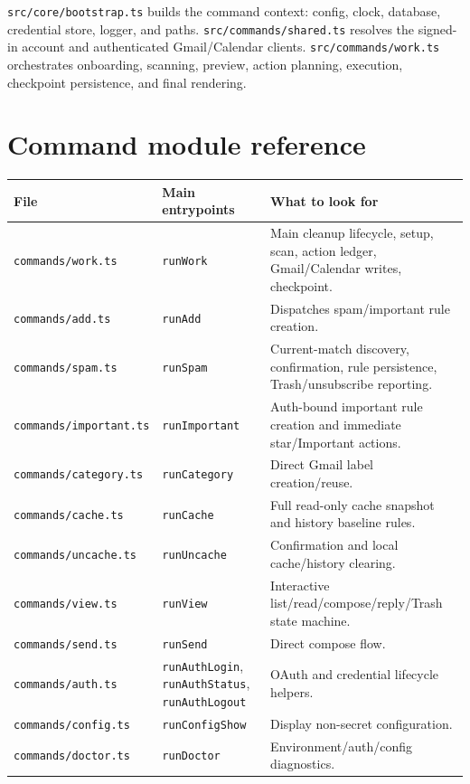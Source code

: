 \documentclass[12pt,oneside]{book}
\newcommand{\code}[1]{\nolinkurl{#1}}
\newcommand{\file}[1]{\nolinkurl{#1}}
\begin{document}
\file{src/core/bootstrap.ts} builds the command context: config, clock, database, credential store, logger, and paths. \file{src/commands/shared.ts} resolves the signed-in account and authenticated Gmail/Calendar clients. \file{src/commands/work.ts} orchestrates onboarding, scanning, preview, action planning, execution, checkpoint persistence, and final rendering.

\section{Command module reference}

\begingroup\scriptsize
\begin{longtable}{P{3.5cm}P{4.0cm}P{8.0cm}}
\toprule
\textbf{File} & \textbf{Main entrypoints} & \textbf{What to look for} \\
\midrule
\endhead
\file{commands/work.ts} & \code{runWork} & Main cleanup lifecycle, setup, scan, action ledger, Gmail/Calendar writes, checkpoint. \\
\file{commands/add.ts} & \code{runAdd} & Dispatches spam/important rule creation. \\
\file{commands/spam.ts} & \code{runSpam} & Current-match discovery, confirmation, rule persistence, Trash/unsubscribe reporting. \\
\file{commands/important.ts} & \code{runImportant} & Auth-bound important rule creation and immediate star/Important actions. \\
\file{commands/category.ts} & \code{runCategory} & Direct Gmail label creation/reuse. \\
\file{commands/cache.ts} & \code{runCache} & Full read-only cache snapshot and history baseline rules. \\
\file{commands/uncache.ts} & \code{runUncache} & Confirmation and local cache/history clearing. \\
\file{commands/view.ts} & \code{runView} & Interactive list/read/compose/reply/Trash state machine. \\
\file{commands/send.ts} & \code{runSend} & Direct compose flow. \\
\file{commands/auth.ts} & \code{runAuthLogin}, \code{runAuthStatus}, \code{runAuthLogout} & OAuth and credential lifecycle helpers. \\
\file{commands/config.ts} & \code{runConfigShow} & Display non-secret configuration. \\
\file{commands/doctor.ts} & \code{runDoctor} & Environment/auth/config diagnostics. \\

\end{longtable}
\end{document}
